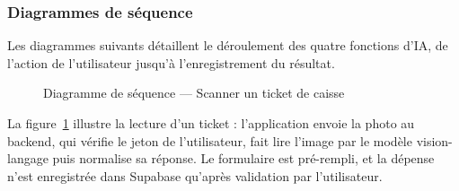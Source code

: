 \subsubsection{Diagrammes de séquence}

Les diagrammes suivants détaillent le déroulement des quatre fonctions d'IA, de l'action
de l'utilisateur jusqu'à l'enregistrement du résultat.

\begin{figure}[H]
\centering
{}
\caption{Diagramme de séquence --- Scanner un ticket de caisse}
\label{fig:seq_scan}
\end{figure}

La figure~\ref{fig:seq_scan} illustre la lecture d'un ticket : l'application envoie la photo
au backend, qui vérifie le jeton de l'utilisateur, fait lire l'image par le modèle
vision-langage puis normalise sa réponse. Le formulaire est pré-rempli, et la dépense n'est
enregistrée dans Supabase qu'après validation par l'utilisateur.


